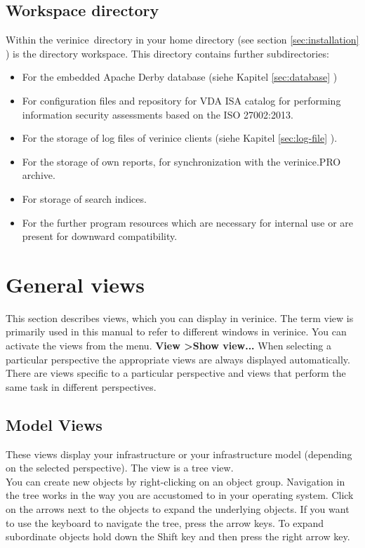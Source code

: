 \documentclass[a4paper,10pt]{book}
\begin{document}
\section{Workspace directory}
\label{sec:workspace-directory}
Within the \grqq verinice\grqq\ directory in your home directory (see section \ref{sec:installation} ) is the directory workspace.
This directory contains further subdirectories:
\begin{itemize}
\item For the embedded Apache Derby database (siehe Kapitel \ref{sec:database} )
\item For configuration files and repository for VDA ISA catalog for performing information security assessments based on the ISO 27002:2013.
\item For the storage of log files of verinice clients (siehe Kapitel \ref{sec:log-file} ).
\item For the storage of own reports, for synchronization with the verinice.PRO archive.
\item For storage of search indices.
\item For the further program resources which are necessary for internal use or are present for downward compatibility.
\end{itemize}


\chapter{General views}
This section describes views, which you can display in verinice. The term view is primarily used in this manual to refer to different windows in verinice.
You can activate the views from the menu.
\textbf{View \textgreater Show view...} When selecting a particular perspective the appropriate views are always displayed automatically.
\newline\\
There are views specific to a particular perspective and views that perform the same task in different perspectives.

\section{Model Views}
These views display your infrastructure or your infrastructure model (depending on the selected perspective).
The view is a tree view.
\newline\\
You can create new objects by right-clicking on an object group. Navigation in the tree works in the way
you are accustomed to in your operating system. Click on the arrows next to the objects to expand the
underlying objects. If you want to use the keyboard to navigate the tree, press the arrow keys. To expand
subordinate objects hold down the Shift key and then press the right arrow key.
\end{document}
